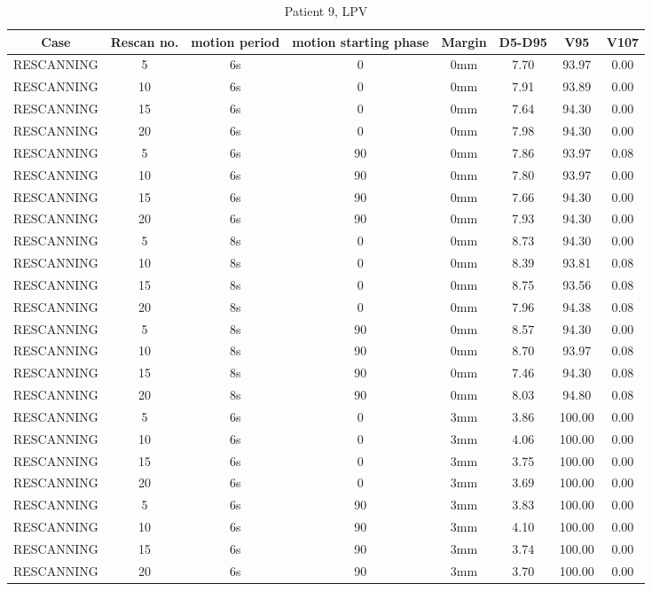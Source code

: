 \documentclass[type=dr, dr=rernat, accentcolor=tud7b,colorbacktitle, bigchapter, openright, twoside, 12pt ]{tudthesis}
\begin{document}
\begin{table}[H]
  \centering
   \scriptsize 
  \caption{Patient 9, LPV}
  \begin{tabular}{|c|c||c|c|c||c|c|c|}
    \hline\hline
    Case & Rescan no. & motion period & motion starting phase & Margin & D5-D95 & V95 & V107\\
    \hline 
RESCANNING & 5 & 6s & 0 & 0mm & 7.70 & 93.97 & 0.00 \\
RESCANNING & 10 & 6s & 0 & 0mm & 7.91 & 93.89 & 0.00 \\
RESCANNING & 15 & 6s & 0 & 0mm & 7.64 & 94.30 & 0.00 \\
RESCANNING & 20 & 6s & 0 & 0mm & 7.98 & 94.30 & 0.00 \\
RESCANNING & 5 & 6s & 90 & 0mm & 7.86 & 93.97 & 0.08 \\
RESCANNING & 10 & 6s & 90 & 0mm & 7.80 & 93.97 & 0.00 \\
RESCANNING & 15 & 6s & 90 & 0mm & 7.66 & 94.30 & 0.00 \\
RESCANNING & 20 & 6s & 90 & 0mm & 7.93 & 94.30 & 0.00 \\
RESCANNING & 5 & 8s & 0 & 0mm & 8.73 & 94.30 & 0.00 \\
RESCANNING & 10 & 8s & 0 & 0mm & 8.39 & 93.81 & 0.08 \\
RESCANNING & 15 & 8s & 0 & 0mm & 8.75 & 93.56 & 0.08 \\
RESCANNING & 20 & 8s & 0 & 0mm & 7.96 & 94.38 & 0.08 \\
RESCANNING & 5 & 8s & 90 & 0mm & 8.57 & 94.30 & 0.00 \\
RESCANNING & 10 & 8s & 90 & 0mm & 8.70 & 93.97 & 0.08 \\
RESCANNING & 15 & 8s & 90 & 0mm & 7.46 & 94.30 & 0.08 \\
RESCANNING & 20 & 8s & 90 & 0mm & 8.03 & 94.80 & 0.08 \\
RESCANNING & 5 & 6s & 0 & 3mm & 3.86 & 100.00 & 0.00 \\
RESCANNING & 10 & 6s & 0 & 3mm & 4.06 & 100.00 & 0.00 \\
RESCANNING & 15 & 6s & 0 & 3mm & 3.75 & 100.00 & 0.00 \\
RESCANNING & 20 & 6s & 0 & 3mm & 3.69 & 100.00 & 0.00 \\
RESCANNING & 5 & 6s & 90 & 3mm & 3.83 & 100.00 & 0.00 \\
RESCANNING & 10 & 6s & 90 & 3mm & 4.10 & 100.00 & 0.00 \\
RESCANNING & 15 & 6s & 90 & 3mm & 3.74 & 100.00 & 0.00 \\
RESCANNING & 20 & 6s & 90 & 3mm & 3.70 & 100.00 & 0.00 \\

\end{tabular}
\end{table}
\end{document}
